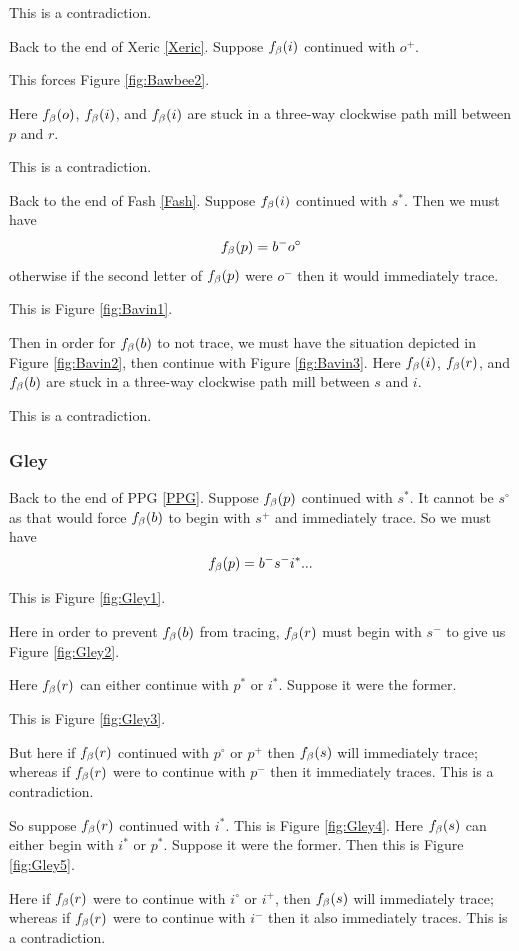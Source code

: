 This is a contradiction.

Back to the end of Xeric \ref{Xeric}. Suppose $f_\beta(i)$ continued with $o^+$.

This forces Figure \ref{fig:Bawbee2}.

Here $f_\beta(o)$, $f_\beta(i)$, and $f_\beta(i)$ are stuck in a three-way clockwise path mill between $p$ and $r$.

This is a contradiction.

Back to the end of Fash \ref{Fash}. Suppose $f_\beta(i)$ continued with $s^*$. Then we must have
$$f_\beta(p) = b^- o^\circ$$
otherwise if the second letter of $f_\beta(p)$ were $o^-$ then it would immediately trace.

This is Figure \ref{fig:Bavin1}.

Then in order for $f_\beta(b)$ to not trace, we must have the situation depicted in Figure \ref{fig:Bavin2}, then continue with Figure \ref{fig:Bavin3}. Here $f_\beta(i)$, $f_\beta(r)$, and $f_\beta(b)$ are stuck in a three-way clockwise path mill between $s$ and $i$.

This is a contradiction.

\subsubsection{Gley}
Back to the end of PPG \ref{PPG}. Suppose $f_\beta(p)$ continued with $s^*$. It cannot be $s^\circ$ as that would force $f_\beta(b)$ to begin with $s^+$ and immediately trace. So we must have
$$f_\beta(p) = b^- s^- i^*...$$

This is Figure \ref{fig:Gley1}.

Here in order to prevent $f_\beta(b)$ from tracing, $f_\beta(r)$ must begin with $s^-$ to give us Figure \ref{fig:Gley2}.

Here $f_\beta(r)$ can either continue with $p^*$ or $i^*$. Suppose it were the former. 

This is Figure \ref{fig:Gley3}.

But here if $f_\beta(r)$ continued with $p^\circ$ or $p^+$ then $f_\beta(s)$ will immediately trace; whereas if $f_\beta(r)$ were to continue with $p^-$ then it immediately traces. This is a contradiction.

So suppose $f_\beta(r)$ continued with $i^*$. This is Figure \ref{fig:Gley4}. Here $f_\beta(s)$ can either begin with $i^*$ or $p^*$. Suppose it were the former. Then this is Figure \ref{fig:Gley5}.

Here if $f_\beta(r)$ were to continue with $i^\circ$ or $i^+$, then $f_\beta(s)$ will immediately trace; whereas if $f_\beta(r)$ were to continue with $i^-$ then it also immediately traces. This is a contradiction.

